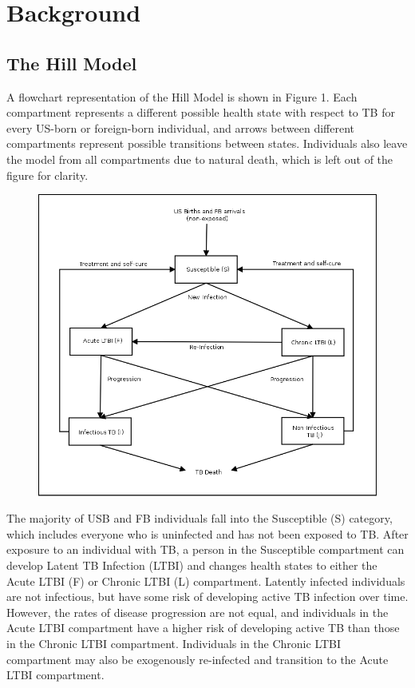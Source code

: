 \documentclass{amsart}
\begin{document}
\section{Background}

\subsection{The Hill Model}
A flowchart representation of the Hill Model is shown in Figure 1.  Each compartment
represents a different possible health state with respect to TB for every 
US-born or foreign-born individual, and arrows between different compartments
represent possible transitions between states.  Individuals also leave the model 
from all compartments due to natural death, which is left out of the figure for clarity.  \\

\begin{figure}
\includegraphics[scale=0.25]{figures/HillModelFlowChart.png}
\end{figure}

The majority of USB and FB individuals fall into the Susceptible (S) category, which includes everyone
who is uninfected and has not been exposed to TB.  After exposure to an individual
with TB, a person in the Susceptible compartment can develop Latent TB Infection (LTBI) and changes
health states to either the Acute LTBI (F) or Chronic LTBI (L) compartment.  Latently
infected individuals are not infectious, but have some risk of developing active TB infection
over time.  However, the rates of disease progression are not equal, and individuals in the
Acute LTBI compartment have a higher risk of developing active TB than those in
the Chronic LTBI compartment.  Individuals in the Chronic LTBI compartment
may also be exogenously re-infected and transition to the Acute LTBI compartment.  \\
\end{document}
